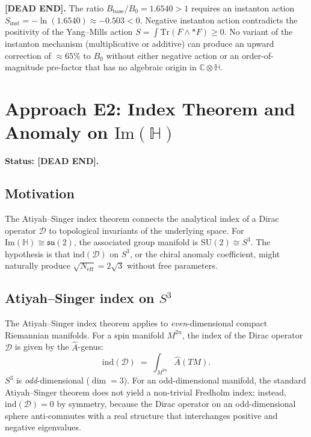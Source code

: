 \documentclass[11pt,a4paper]{article}
\theoremstyle{definition}
\theoremstyle{remark}
\begin{document}
\textbf{[DEAD END].}
The ratio $B_{\mathrm{base}}/B_0 = 1.6540 > 1$ requires an instanton action
$S_{\mathrm{inst}} = -\ln(1.6540) \approx -0.503 < 0$.
Negative instanton action contradicts the positivity of the Yang--Mills action
$S = \int \mathrm{Tr}(F \wedge *F) \geq 0$.
No variant of the instanton mechanism (multiplicative or additive) can produce
an upward correction of $\approx 65\%$ to $B_0$ without either negative action
or an order-of-magnitude pre-factor that has no algebraic origin in
$\mathbb{C}\otimes\mathbb{H}$.

\section{Approach E2: Index Theorem and Anomaly on $\mathrm{Im}(\mathbb{H})$}
\label{sec:E2_index}

\textbf{Status: [DEAD END].}

\subsection{Motivation}

The Atiyah--Singer index theorem connects the analytical index of a Dirac
operator $\mathcal{D}$ to topological invariants of the underlying space.
For $\mathrm{Im}(\mathbb{H}) \cong \mathfrak{su}(2)$, the associated group manifold
is $\mathrm{SU}(2) \cong S^3$.
The hypothesis is that $\mathrm{ind}(\mathcal{D})$ on $S^3$, or the chiral anomaly
coefficient, might naturally produce $\sqrt{N_{\mathrm{eff}}} = 2\sqrt{3}$
without free parameters.

\subsection{Atiyah--Singer index on $S^3$}

The Atiyah--Singer index theorem applies to \emph{even}-dimensional compact
Riemannian manifolds.
For a spin manifold $M^{2n}$, the index of the Dirac operator $\mathcal{D}$
is given by the $\hat{A}$-genus:
\begin{equation}
  \mathrm{ind}(\mathcal{D}) \;=\; \int_{M^{2n}} \hat{A}(TM).
  \label{eq:AS_index}
\end{equation}
$S^3$ is \emph{odd}-dimensional ($\dim = 3$).
For an odd-dimensional manifold, the standard Atiyah--Singer theorem
does not yield a non-trivial Fredholm index; instead, $\mathrm{ind}(\mathcal{D}) = 0$
by symmetry, because the Dirac operator on an odd-dimensional sphere
anti-commutes with a real structure that interchanges positive and negative
eigenvalues.
\end{document}
